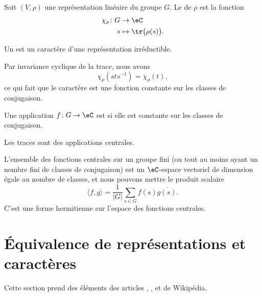 \begin{definition}
	Soit \( (V,\rho)\) une représentation linéaire du groupe \( G\). Le  de \( \rho\) est la fonction
	\begin{equation}
		\begin{aligned}
			\chi_{\rho}\colon G & \to \eC                         \\
			s                   & \mapsto \tr\big( \rho(s) \big).
		\end{aligned}
	\end{equation}

	Un  est un caractère d'une représentation irréductible.
\end{definition}
Par invariance cyclique de la trace, nous avons
\begin{equation}
	\chi_{\rho}(sts^{-1})=\chi_{\rho}(t),
\end{equation}
ce qui fait que le caractère est une fonction constante sur les classes de conjugaison.


\begin{definition}
	Une application \( f\colon G\to \eC\) est  si elle est constante sur les classes de conjugaison.
\end{definition}
Les traces sont des applications centrales.

L'ensemble des fonctions centrales sur un groupe fini (ou tout au moins ayant un nombre fini de classes de conjugaison) est un \( \eC\)-espace vectoriel de dimension égale au nombre de classes, et nous pouvons mettre le produit scalaire
\begin{equation}    \label{EqJrEpVI}
	\langle f, g\rangle =\frac{1}{ | G | }\sum_{s\in G}f(s)\overline{ g(s) }.
\end{equation}
C'est une forme hermitienne sur l'espace des fonctions centrales.

\section{Équivalence de représentations et caractères}

Cette section prend des éléments des articles , ,  et  de Wikipédia.

